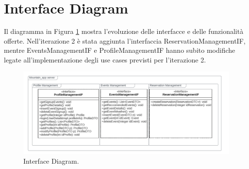 \section{Interface Diagram}
Il diagramma in Figura \ref*{fig:InterfaceDiagramIt2} mostra l'evoluzione delle interfacce e delle funzionalità offerte.
Nell'iterazione 2 è stata aggiunta l'interfaccia ReservationManagementIF, mentre EventsManagementIF e ProfileManagementIF hanno subito
modifiche legate all'implementazione degli use cases previsti per l'iterazione 2.
\begin{figure}[h!]
	\centering
	\includegraphics[width=0.8\linewidth]{Iterazione 2/diagrams/Interface.drawio.png}
	\caption{Interface Diagram.}
	\label{fig:InterfaceDiagramIt2}
\end{figure}